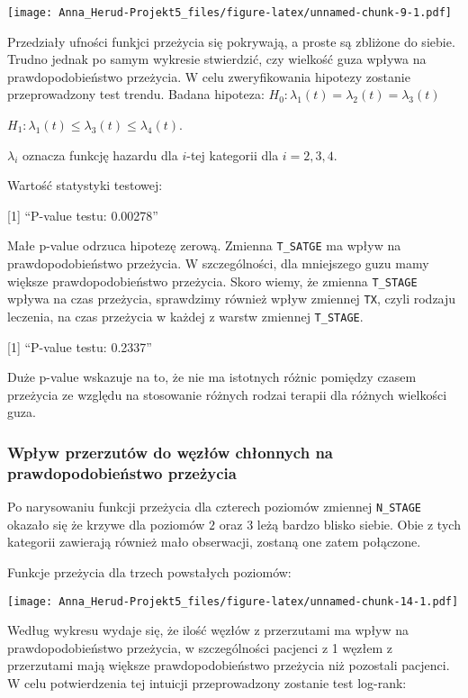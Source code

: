 \documentclass[
]{article}
\begin{document}
\texttt{[image: Anna\_Herud-Projekt5\_files/figure-latex/unnamed-chunk-9-1.pdf]}

Przedziały ufności funkjci przeżycia się pokrywają, a proste są zbliżone
do siebie. Trudno jednak po samym wykresie stwierdzić, czy wielkość guza
wpływa na prawdopodobieństwo przeżycia. W celu zweryfikowania hipotezy
zostanie przeprowadzony test trendu. Badana hipoteza:
\(H_0: \lambda_{1}(t)=\lambda_{2}(t) = \lambda_{3}(t)\)

\(H_1:\lambda_{1}(t)\leq \lambda_{3}(t) \leq \lambda_{4}(t)\).

\(\lambda_{i}\) oznacza funkcję hazardu dla \(i\)-tej kategorii dla
\(i=2, 3,4\).

Wartość statystyki testowej:

{[}1{]} ``P-value testu: 0.00278''

Małe p-value odrzuca hipotezę zerową. Zmienna \texttt{T\_SATGE} ma wpływ
na prawdopodobieństwo przeżycia. W szczególności, dla mniejszego guzu
mamy większe prawdopodobieństwo przeżycia. Skoro wiemy, że zmienna
\texttt{T\_STAGE} wpływa na czas przeżycia, sprawdzimy również wpływ
zmiennej \texttt{TX}, czyli rodzaju leczenia, na czas przeżycia w każdej
z warstw zmiennej \texttt{T\_STAGE}.

{[}1{]} ``P-value testu: 0.2337''

Duże p-value wskazuje na to, że nie ma istotnych różnic pomiędzy czasem
przeżycia ze względu na stosowanie różnych rodzai terapii dla różnych
wielkości guza.

\hypertarget{wpux142yw-przerzutuxf3w-do-wux119zux142uxf3w-chux142onnych-na-prawdopodobieux144stwo-przeux17cycia}{%
\subsubsection{Wpływ przerzutów do węzłów chłonnych na
prawdopodobieństwo
przeżycia}\label{wpux142yw-przerzutuxf3w-do-wux119zux142uxf3w-chux142onnych-na-prawdopodobieux144stwo-przeux17cycia}}

Po narysowaniu funkcji przeżycia dla czterech poziomów zmiennej
\texttt{N\_STAGE} okazało się że krzywe dla poziomów \(2\) oraz \(3\)
leżą bardzo blisko siebie. Obie z tych kategorii zawierają również mało
obserwacji, zostaną one zatem połączone.

Funkcje przeżycia dla trzech powstałych poziomów:

\texttt{[image: Anna\_Herud-Projekt5\_files/figure-latex/unnamed-chunk-14-1.pdf]}

Według wykresu wydaje się, że ilość węzłów z przerzutami ma wpływ na
prawdopodobieństwo przeżycia, w szczególności pacjenci z 1 węzłem z
przerzutami mają większe prawdopodobieństwo przeżycia niż pozostali
pacjenci. W celu potwierdzenia tej intuicji przeprowadzony zostanie test
log-rank:
\end{document}
